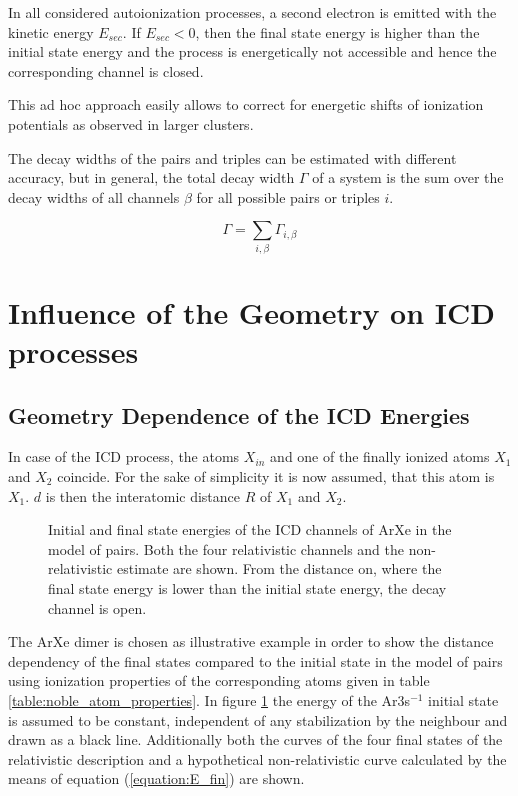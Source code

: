 In all considered autoionization processes, a second electron
is emitted with the kinetic energy $E_{sec}$. If $E_{sec}<0$, then
the final state energy is higher than the initial state energy and the
process is energetically not accessible and hence the corresponding channel
is closed.

This ad hoc approach easily allows to correct for energetic shifts of
ionization potentials as observed in larger clusters.

The decay widths of the pairs and triples can be estimated with
different accuracy, but in general, the total decay width $\Gamma$ of
a system is the sum over the decay widths of all channels $\beta$ for
all possible pairs or triples $i$.

\begin{equation}
  \Gamma = \sum\limits_{i,\beta}\Gamma_{i,\beta}
\end{equation}


\section{Influence of the Geometry on ICD processes} \label{section:icd_geom}

\subsection{Geometry Dependence of the ICD Energies}
In case of the \ac{ICD} process, the atoms $X_{in}$ and one of
the finally ionized atoms $X_1$ and $X_2$ coincide. For the sake of simplicity
it is now assumed, that this atom is $X_1$. $d$ is then the interatomic distance
$R$ of $X_1$ and $X_2$.

\begin{figure}[h]
 \centering
 
 \caption{Initial and final state energies of the ICD channels of ArXe in the
          model of pairs. Both the four relativistic channels and
          the non-relativistic estimate are shown. From the distance on, where
          the final state energy is lower than the initial state energy, the
          decay channel is open.}
 \label{figure:ArXe_energy_curves_unshifted}
\end{figure}

The ArXe dimer is chosen as illustrative example in order to show the distance
dependency of the final states compared to the initial state
in the model of pairs using
ionization properties of the corresponding atoms given in table
\ref{table:noble_atom_properties}.
In figure \ref{figure:ArXe_energy_curves_unshifted} the energy of
the Ar3s$^{-1}$ initial
state is assumed to be constant, independent of any stabilization by the
neighbour and drawn as a black line. Additionally both the
curves of the four final states of the relativistic description and
a hypothetical non-relativistic curve calculated by the means of
equation (\ref{equation:E_fin}) are shown.

